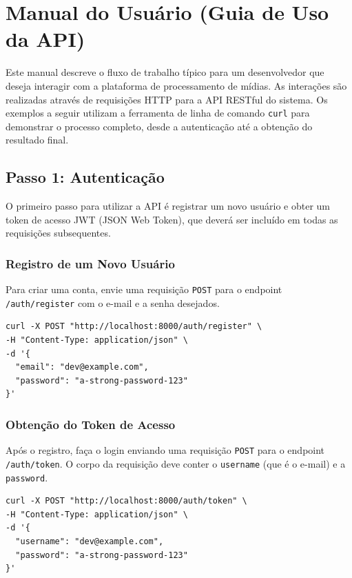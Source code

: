 \section{Manual do Usuário (Guia de Uso da API)}
\label{sec:manual_usuario}

Este manual descreve o fluxo de trabalho típico para um desenvolvedor que deseja interagir com a plataforma de processamento de mídias. As interações são realizadas através de requisições HTTP para a API RESTful do sistema. Os exemplos a seguir utilizam a ferramenta de linha de comando \texttt{curl} para demonstrar o processo completo, desde a autenticação até a obtenção do resultado final.

\subsection{Passo 1: Autenticação}

O primeiro passo para utilizar a API é registrar um novo usuário e obter um token de acesso JWT (JSON Web Token), que deverá ser incluído em todas as requisições subsequentes.

\subsubsection{Registro de um Novo Usuário}
Para criar uma conta, envie uma requisição \texttt{POST} para o endpoint \texttt{/auth/register} com o e-mail e a senha desejados.

\begin{verbatim}
curl -X POST "http://localhost:8000/auth/register" \
-H "Content-Type: application/json" \
-d '{
  "email": "dev@example.com",
  "password": "a-strong-password-123"
}'
\end{verbatim}

\subsubsection{Obtenção do Token de Acesso}
Após o registro, faça o login enviando uma requisição \texttt{POST} para o endpoint \texttt{/auth/token}. O corpo da requisição deve conter o \texttt{username} (que é o e-mail) e a \texttt{password}.

\begin{verbatim}
curl -X POST "http://localhost:8000/auth/token" \
-H "Content-Type: application/json" \
-d '{
  "username": "dev@example.com",
  "password": "a-strong-password-123"
}'
\end{verbatim}

